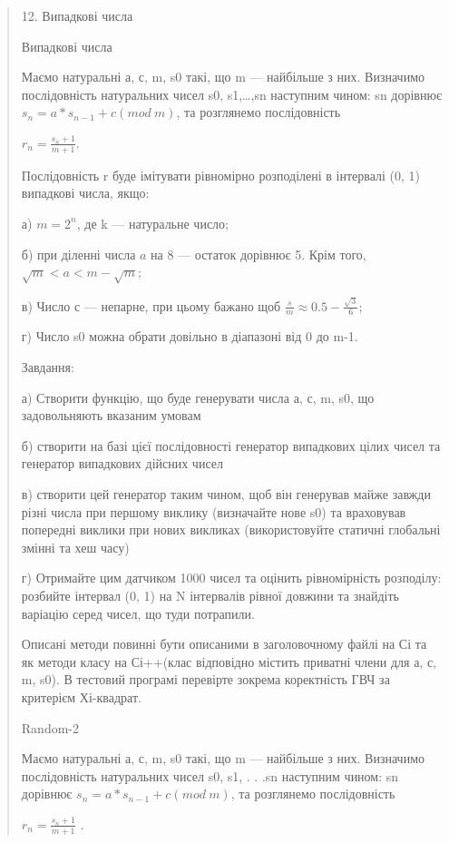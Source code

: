 \documentclass[]{article}
\begin{document}
\begin{quote}

12. Випадкові числа

Випадкові числа

Маємо натуральні а, с, m, s0 такі, що m --- найбільше з них. Визначимо
послідовність натуральних чисел s0, s1,\ldots{},sn наступним чином: sn
дорівнює \(s_{n} = a*s_{n - 1} + c(mod\ m)\), та розглянемо
послідовність

\(r_{n} = \frac{s_{n} + 1}{m + 1}\).

Послідовність r буде імітувати рівномірно розподілені в інтервалі (0, 1)
випадкові числа, якщо:

а) \({m = 2}^{n}\), де k --- натуральне число;

б) при діленні числа \(a\) на 8 --- остаток дорівнює 5. Крім того,
\(\sqrt{m} < a < m - \sqrt{m}\);

в) Число с --- непарне, при цьому бажано щоб
\(\frac{s}{m} \approx 0.5 - \frac{\sqrt{3}}{6}\);

г) Число s0 можна обрати довільно в діапазоні від 0 до m-1.

Завдання:

а) Створити функцію, що буде генерувати числа а, с, m, s0, що
задовольняють вказаним умовам

б) створити на базі цієї послідовності генератор випадкових цілих чисел
та генератор випадкових дійсних чисел

в) створити цей генератор таким чином, щоб він генерував майже завжди
різні числа при першому виклику (визначайте нове s0) та враховував
попередні виклики при нових викликах (використовуйте статичні глобальні
змінні та хеш часу)

г) Отримайте цим датчиком 1000 чисел та оцінить рівномірність розподілу:
розбийте інтервал (0, 1) на N інтервалів рівної довжини та знайдіть
варіацію серед чисел, що туди потрапили.

Описані методи повинні бути описаними в заголовочному файлі на Сі та як
методи класу на Сі++(клас відповідно містить приватні члени для а, с, m,
s0). В тестовий програмі перевірте зокрема коректність ГВЧ за критерієм
Хі-квадрат.

Random-2

Маємо натуральні а, с, m, s0 такі, що m --- найбільше з них. Визначимо
послідовність натуральних чисел s0, s1, . . .sn наступним чином: sn
дорівнює \(s_{n} = a*s_{n - 1} + c(mod\ m)\), та розглянемо
послідовність

\(r_{n} = \frac{s_{n} + 1}{m + 1}\) .


\end{quote}
\end{document}
